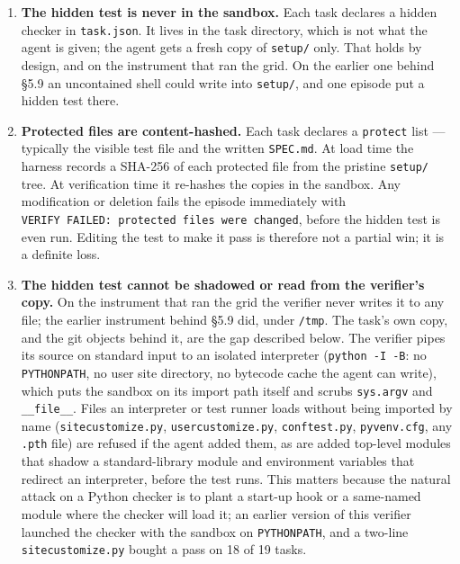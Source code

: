 \documentclass[
  10pt,
  a4paper,
]{article}
\providecommand{\tightlist}{%
  \setlength{\itemsep}{0pt}\setlength{\parskip}{0pt}}
\let\oldtexttt\texttt
\renewcommand{\texttt}[1]{{\small\oldtexttt{#1}}}
\begin{document}
\begin{enumerate}
\def\labelenumi{\arabic{enumi}.}
\tightlist
\item
  \textbf{The hidden test is never in the sandbox.} Each task declares a
  hidden checker in \texttt{task.json}. It lives in the task directory,
  which is not what the agent is given; the agent gets a fresh copy of
  \texttt{setup/} only. That holds by design, and on the instrument that
  ran the grid. On the earlier one behind §5.9 an uncontained shell
  could write into \texttt{setup/}, and one episode put a hidden test
  there.
\item
  \textbf{Protected files are content-hashed.} Each task declares a
  \texttt{protect} list --- typically the visible test file and the
  written \texttt{SPEC.md}. At load time the harness records a SHA-256
  of each protected file from the pristine \texttt{setup/} tree. At
  verification time it re-hashes the copies in the sandbox. Any
  modification or deletion fails the episode immediately with
  \texttt{VERIFY\ FAILED:\ protected\ files\ were\ changed}, before the
  hidden test is even run. Editing the test to make it pass is therefore
  not a partial win; it is a definite loss.
\item
  \textbf{The hidden test cannot be shadowed or read from the verifier's
  copy.} On the instrument that ran the grid the verifier never writes
  it to any file; the earlier instrument behind §5.9 did, under
  \texttt{/tmp}. The task's own copy, and the git objects behind it, are
  the gap described below. The verifier pipes its source on standard
  input to an isolated interpreter (\texttt{python\ -I\ -B}: no
  \texttt{PYTHONPATH}, no user site directory, no bytecode cache the
  agent can write), which puts the sandbox on its import path itself and
  scrubs \texttt{sys.argv} and \texttt{\_\_file\_\_}. Files an
  interpreter or test runner loads without being imported by name
  (\texttt{sitecustomize.py}, \texttt{usercustomize.py},
  \texttt{conftest.py}, \texttt{pyvenv.cfg}, any \texttt{.pth} file) are
  refused if the agent added them, as are added top-level modules that
  shadow a standard-library module and environment variables that
  redirect an interpreter, before the test runs. This matters because
  the natural attack on a Python checker is to plant a start-up hook or
  a same-named module where the checker will load it; an earlier version
  of this verifier launched the checker with the sandbox on
  \texttt{PYTHONPATH}, and a two-line \texttt{sitecustomize.py} bought a
  pass on 18 of 19 tasks.
\end{enumerate}
\end{document}
